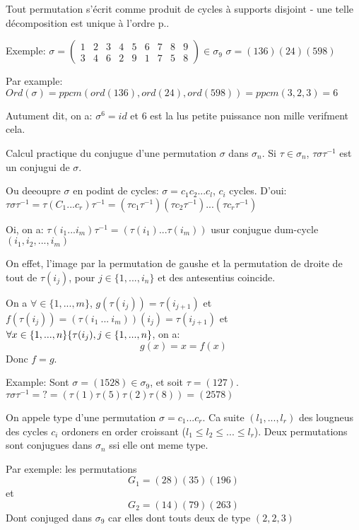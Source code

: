 \begin{theorem}
	Tout permutation s'écrit comme produit de cycles à supports disjoint - une telle décomposition est unique à l'ordre p..
\end{theorem}

Exemple: $\sigma = \left(\begin{array}{ccccccccc}1&2&3&4&5&6&7&8&9\\3&4&6&2&9&1&7&5&8\end{array}\right)\in\sigma_9$
$\sigma=(136)(24)(598)$

Par example: $Ord(\sigma)=ppcm(ord(136), ord(24), ord(598))=ppcm(3,2,3)=6$

Autument dit, on a: $\sigma^6=id$ et 6 est la lus petite puissance non mille verifment cela.

Calcul practique du conjugue d'une permutation $\sigma$ dans $\sigma_n$. Si $\tau\in\sigma_n$, $\tau\sigma\tau^{-1}$ est un conjugui de $\sigma$.

Ou deeoupre $\sigma$ en podint de cycles: $\sigma=c_1 c_2...c_l$, $c_i$ cycles.
D'oui: $\tau\sigma\tau^{-1} =\tau(C_1...c_r)\tau^{-1}=(\tau c_1\tau^{-1})(\tau c_2\tau^{-1})...(\tau c_r\tau^{-1})$

Oi, on a: $\tau(i_1...i_m)\tau^{-1}=(\tau(i_1)...\tau(i_m))$ usur conjugue dum-cycle $(i_1, i_2, ..., i_m)$

On effet, l'image par la permutation de gaushe et la permutation de droite de tout de $\tau(i_j)$, pour $j\in\{1,...,i_n\}$ et des antesentius coincide.

On a $\forall\in\{1,...,m\}$, $g(\tau(i_j))=\tau(i_{j+1})$ et $f(\tau(i_j))=(\tau(i_1\ ...\ i_m))(i_j)=\tau(i_{j+1})$
et $\forall x\in \{ 1,...,n\}\\ \{\tau(i_j), j\in\{1,...,n\}$, on a:
$$g(x)=x=f(x)$$
Donc $f=g$.

Example:
Sont $\sigma=(1528)\in\sigma_9$, et soit $\tau=(127)$.
$\tau\sigma\tau^{-1}=?= (\tau(1)\tau(5)\tau(2)\tau(8))=(2578)$

\begin{proposition}
	On appele type d'une permutation $\sigma=c_1... c_r$. Ca suite $(l_1,...,l_r)$ des lougneus des cycles $c_i$ ordoners en order croissant ($l_1\leq l_2\leq ... \leq l_r$).
	Deux permutations sont conjugues dans $\sigma_n$ ssi elle ont meme type.
\end{proposition}

Par exemple: les permutations
$$G_1=(28)(35)(196)$$
et
$$G_2=(14)(79)(263)$$
Dont conjuged dans $\sigma_9$ car elles dont touts deux de type $(2,2,3)$

